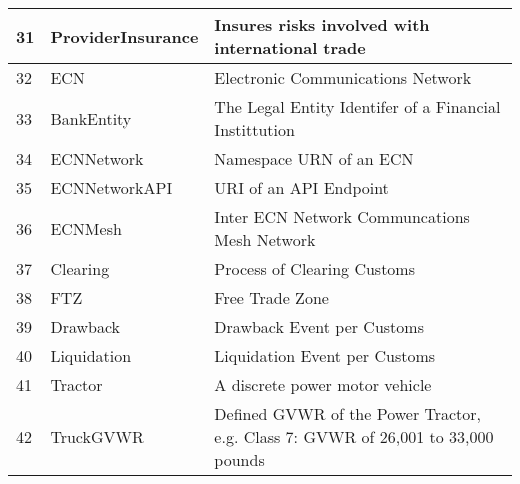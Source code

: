 \begin{table}
\begin{tabular}{|l|l|l|}
        31 & ProviderInsurance & Insures risks involved with international trade \\ \hline
        32 & ECN & Electronic Communications Network \\ \hline
        33 & BankEntity & The Legal Entity Identifer of a Financial Instittution \\ \hline
        34 & ECNNetwork & Namespace URN of an ECN \\ \hline
        35 & ECNNetworkAPI & URI of an API Endpoint \\ \hline
        36 & ECNMesh & Inter ECN Network Communcations Mesh Network \\ \hline
        37 & Clearing & Process of Clearing Customs \\ \hline
        38 & FTZ & Free Trade Zone \\ \hline
        39 & Drawback & Drawback Event per Customs \\ \hline
        40 & Liquidation & Liquidation Event per Customs \\ \hline
        41 & Tractor & A discrete power motor vehicle \\ \hline
        42 & TruckGVWR & Defined GVWR of the Power Tractor, e.g. Class 7: GVWR of 26,001 to 33,000 pounds \\ \hline
    \end{tabular}
\end{table}
